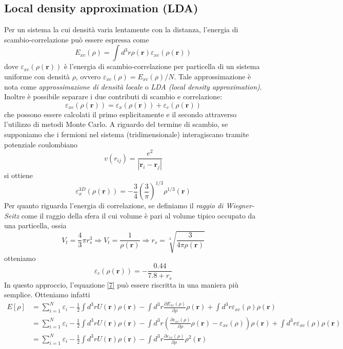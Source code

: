 \documentclass[11pt,a4paper]{article}
\begin{document}
\subsection{Local density approximation (LDA)}
Per un sistema la cui densità varia lentamente con la distanza, l'energia di scambio-correlazione può essere espressa come
\begin{equation}
E_{xc}(\rho) = \int d^3r \rho(\textbf{r}) \varepsilon_{xc}(\rho(\textbf{r}))
\end{equation}
dove $\varepsilon_{xc}(\rho(\textbf{r}))$ è l'energia di scambio-correlazione per particella di un sistema uniforme con densità $\rho$, ovvero $\varepsilon_{xc}(\rho) = E_{xc}(\rho)/N$. Tale approssimazione è nota come \emph{approssimazione di densità locale} o \emph{LDA (local density approximation)}. Inoltre è possibile separare i due contributi di scambio e correlazione:
\begin{equation}
\varepsilon_{xc}(\rho(\textbf{r})) = \varepsilon_{x}(\rho(\textbf{r})) + \varepsilon_c(\rho(\textbf{r})) 
\end{equation}
che possono essere calcolati il primo esplicitamente e il secondo attraverso l'utilizzo di metodi Monte Carlo. A riguardo del termine di scambio, se supponiamo che i fermioni nel sistema (tridimensionale) interagiscano tramite potenziale coulombiano
\[
v(r_{ij}) = \frac{e^2}{|\textbf{r}_i-\textbf{r}_j|}
\]
si ottiene
\begin{equation}
\varepsilon_{x}^{3D}(\rho(\textbf{r})) = -\frac{3}{4}\left( \frac{3}{\pi} \right)^{1/3}\rho^{1/3}(\textbf{r})
\end{equation}
Per quanto riguarda l'energia di correlazione, se definiamo il \emph{raggio di Wiegner-Seitz} come il raggio della sfera il cui volume è pari al volume tipico occupato da una particella, ossia 
\[
V_t = \frac{4}{3}\pi r_s^3 \Longrightarrow V_t = \frac{1}{\rho(\textbf{r})} \Longrightarrow r_s = \sqrt[3]{\frac{3}{4\pi \rho(\textbf{r})}}
\]
otteniamo
\begin{equation}
\varepsilon_c(\rho(\textbf{r})) = -\frac{0.44}{7.8 +r_s}
\end{equation}
In questo approccio, l'equazione \eqref{7} può essere riscritta in una maniera più semplice. Otteniamo infatti
\[
\begin{split}
E[\rho] &= \sum_{i=1}^N \varepsilon_i - \frac{1}{2}\int d^3r U(\textbf{r}) \rho(\textbf{r}) - \int d^3r \frac{\partial E_{xc}(\rho)}{\partial \rho}\rho(\textbf{r}) + \int d^3r \varepsilon_{xc}(\rho)\rho(\textbf{r}) \\
&= \sum_{i=1}^N \varepsilon_i - \frac{1}{2}\int d^3r U(\textbf{r}) \rho(\textbf{r}) - \int d^3r \left( \frac{\partial \varepsilon_{xc}(\rho)}{\partial\rho}\rho(\textbf{r}) - \varepsilon_{xc}(\rho) \right)\rho(\textbf{r}) + \int d^3r \varepsilon_{xc}(\rho)\rho(\textbf{r}) \\
&= \sum_{i=1}^N \varepsilon_i - \frac{1}{2}\int d^3r U(\textbf{r}) \rho(\textbf{r}) - \int d^3r \frac{\partial \varepsilon_{xc}(\rho)}{\partial\rho}\rho^2(\textbf{r})
\end{split}
\]
\end{document}
